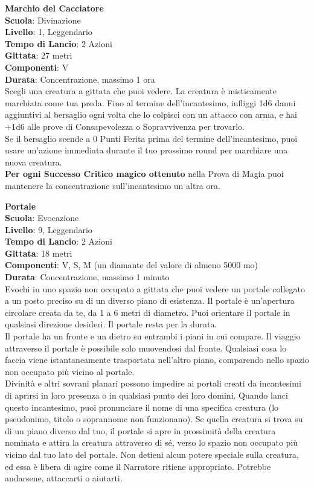 \begin{multicols}{2}
\medskip\textbf{Marchio del Cacciatore}\\
\textbf{Scuola}: Divinazione\\
\textbf{Livello}: 1, Leggendario\\
\textbf{Tempo di Lancio}: 2 Azioni\\
\textbf{Gittata}: 27 metri\\
\textbf{Componenti}: V \\
\textbf{Durata}: Concentrazione, massimo 1 ora\\
Scegli una creatura a gittata che puoi vedere. La creatura è misticamente marchiata come tua preda. Fino al termine dell’incantesimo, infliggi 1d6 danni aggiuntivi al bersaglio ogni volta che lo colpisci con un attacco con arma, e hai +1d6 alle prove di Consapevolezza o Sopravvivenza per trovarlo.\\
Se il bersaglio scende a 0 Punti Ferita prima del termine dell’incantesimo, puoi usare un’azione immediata durante il tuo prossimo round per marchiare una nuova creatura.\\
\textbf{Per ogni Successo Critico magico ottenuto} nella Prova di Magia puoi mantenere la concentrazione sull’incantesimo un altra ora.

\medskip\textbf{Portale}\\
\textbf{Scuola}: Evocazione\\
\textbf{Livello}: 9, Leggendario\\
\textbf{Tempo di Lancio}: 2 Azioni\\
\textbf{Gittata}: 18 metri\\
\textbf{Componenti}: V, S, M (un diamante del valore di almeno 5000 mo)\\
\textbf{Durata}: Concentrazione, massimo 1 minuto\\
Evochi in uno spazio non occupato a gittata che puoi vedere un portale collegato a un posto preciso su di un diverso piano di esistenza. Il portale è un'apertura circolare creata da te, da 1 a 6 metri di diametro. Puoi orientare il portale in qualsiasi direzione desideri. Il portale resta per la durata.\\
Il portale ha un fronte e un dietro su entrambi i piani in cui compare. Il viaggio attraverso il portale è possibile solo muovendosi dal fronte. Qualsiasi cosa lo faccia viene istantaneamente trasportata nell'altro piano, comparendo nello spazio non occupato più vicino al portale.\\
Divinità e altri sovrani planari possono impedire ai portali creati da incantesimi di aprirsi in loro presenza o in qualsiasi punto dei loro domini. Quando lanci questo incantesimo, puoi pronunciare il nome di una specifica creatura (lo pseudonimo, titolo o soprannome non funzionano). Se quella creatura si trova su di un piano diverso dal tuo, il portale si apre in prossimità della creatura nominata e attira la creatura attraverso di sé, verso lo spazio non occupato più vicino dal tuo lato del portale. Non detieni alcun potere speciale sulla creatura, ed essa è libera di agire come il Narratore ritiene appropriato. Potrebbe andarsene, attaccarti o aiutarti.


\end{multicols}

